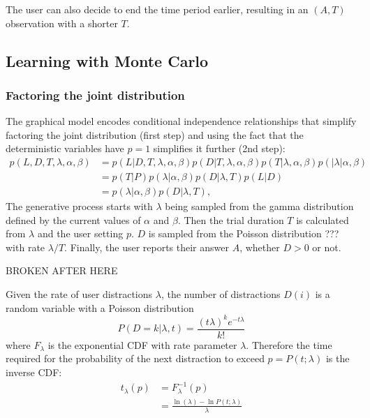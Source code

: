 \documentclass{article}
\begin{document}
The user can also decide to end the time period earlier, resulting in an $(A, T)$ observation with a shorter $T$.
\subsection{Learning with Monte Carlo}



\subsubsection{Factoring the joint distribution}
The graphical model encodes conditional independence relationships that simplify factoring the joint distribution (first step) and using the fact that the deterministic variables have $p=1$ simplifies it further (2nd step):
\begin{align}
p(L, D, T, \lambda, \alpha, \beta) &= p(L| D, T, \lambda, \alpha, \beta)p(D| T, \lambda, \alpha, \beta)p(T| \lambda, \alpha, \beta)p(| \lambda| \alpha, \beta) \nonumber\\
&= p(T|P)p(\lambda|\alpha, \beta)p(D|\lambda, T)p(L|D)\nonumber\\
&=p(\lambda|\alpha, \beta)p(D|\lambda, T)\label{joint},
\end{align}
The generative process starts with $\lambda$ being sampled from the gamma distribution defined by the current values of $\alpha$ and $\beta$. Then the trial duration $T$ is calculated from $\lambda$ and the user setting $p$. $D$ is sampled from the Poisson distribution ??? with rate $\lambda/T$. Finally, the user reports their answer $A$, whether $D>0$ or not.



BROKEN AFTER HERE



Given the rate of user distractions $\lambda$, the number of distractions $D(i)$ is a random variable with a Poisson distribution
\begin{equation}
  P(D=k|\lambda,t) = \frac{ (t\lambda)^k e^{-t\lambda}}{k!}%
\end{equation}
where $F_\lambda$ is the exponential CDF with rate parameter $\lambda$.  Therefore the time required for the probability of the next distraction to exceed $p=P(t;\lambda)$ is the inverse CDF:
\begin{align}
  t_\lambda(p)& = F_\lambda^{-1}(p)\nonumber\\
  & = \frac{\ln(\lambda) -\ln P(t;\lambda) }{\lambda}\label{inv_dist}
\end{align}
\end{document}
